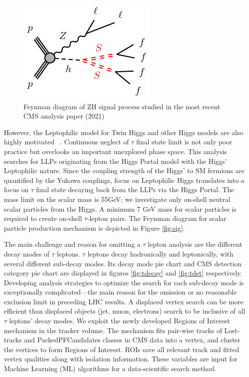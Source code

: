\begin{figure}[h!]
  \label{fig:ZHfeyn}
  \centering
  \includegraphics[width=0.47\linewidth]{figs/Zh-llffff-SS.pdf}
  \caption{Feynman diagram of ZH signal process studied in the most recent CMS analysis paper (2021) \cite{ZHAN}}
\end{figure}


However, the Leptophilic model for Twin Higgs and other Higgs models are also highly motivated ~\cite{Lepto}. Continuous neglect of $\tau$ final state limit is not only poor practice but overlooks an important unexplored phase space.
This analysis searches for LLPs originating from the Higgs Portal model with the Higgs' Leptophilic nature.
Since the coupling strength of the Higgs' to SM fermions are quantified by the Yukawa couplings, focus on Leptophilic Higgs translates into a focus on $\tau$ final state decaying back from the LLPs via the Higgs Portal.
The mass limit on the scalar mass is 55GeV; we investigate only on-shell neutral scalar particles from the Higgs.
A minimum 7 GeV mass for scalar particles is required to create on-shell $\tau$-lepton pairs.
The Feynman diagram for scalar particle production mechanism is depicted in Figure \ref{fig:sig}.


The main challenge and reason for omitting a $\tau$ lepton analysis are the different decay modes of $\tau$ leptons.
$\tau$ leptons decay hadronically and leptonically, with several different sub-decay modes.
Its decay mode pie chart and CMS detection category pie chart are displayed in figures \ref{fig:tdecay} and \ref{fig:tdet} respectively.
Developing analysis strategies to optimize the search for each sub-decay mode is exceptionally complicated—the main reason for the omission or no reasonable exclusion limit in preceding LHC results.
A displaced vertex search can be more efficient than displaced objects (jet, muon, electrons) search to be inclusive of all $\tau$ leptons' decay modes.
We exploit the newly developed Regions of Interest mechanism in the tracker volume.
The mechanism fits pair-wise tracks of Lost-tracks and PackedPFCandidates classes in CMS data into a vertex, and cluster the vertices to form Regions of Interest. 
ROIs save all relevant track and fitted vertex qualities along with isolation information.
These variables are input for Machine Learning (ML) algorithms for a data-scientific search method.

